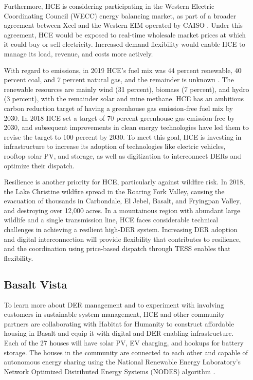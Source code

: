 Furthermore, HCE is considering participating in the Western Electric Coordinating Council (WECC) energy balancing market, as part of a broader agreement between Xcel and the Western EIM operated by CAISO \citep{CAISO2020}. Under this agreement, HCE would be exposed to real-time wholesale market prices at which it could buy or sell electricity. Increased demand flexibility would enable HCE to manage its load, revenue, and costs more actively.

With regard to emissions, in 2019 HCE's fuel mix was 44 percent renewable, 40 percent coal, and 7 percent natural gas, and the remainder is unknown \citep{HCE2019}. The renewable resources are mainly wind (31 percent), biomass (7 percent), and hydro (3 percent), with the remainder solar and mine methane. HCE has an ambitious carbon reduction target of having a greenhouse gas emission-free fuel mix by 2030. In 2018 HCE set a target of 70 percent greenhouse gas emission-free by 2030, and subsequent improvements in clean energy technologies have led them to revise the target to 100 percent by 2030. To meet this goal, HCE is investing in infrastructure to increase its adoption of technologies like electric vehicles, rooftop solar PV, and storage, as well as digitization to interconnect DERs and optimize their dispatch. 

Resilience is another priority for HCE, particularly against wildfire risk. In 2018, the Lake Christine wildfire spread in the Roaring Fork Valley, causing the evacuation of thousands in Carbondale, El Jebel, Basalt, and Fryingpan Valley, and destroying over 12,000 acres. In a mountainous region with abundant large wildlife and a single transmission line, HCE faces considerable technical challenges in achieving a resilient high-DER system. Increasing DER adoption and digital interconnection will provide flexibility that contributes to resilience, and the coordination using price-based dispatch through TESS enables that flexibility.

\subsection{Basalt Vista}\label{sec:Basalt}

To learn more about DER management and to experiment with involving customers in sustainable system management, HCE and other community partners are collaborating with Habitat for Humanity to construct affordable housing in Basalt and equip it with digital and DER-enabling infrastructure. Each of the 27 houses will have solar PV, EV charging, and hookups for battery storage. The houses in the community are connected to each other and capable of autonomous energy sharing using the National Renewable Energy Laboratory's Network Optimized Distributed Energy Systems (NODES) algorithm \citep{IEEESpectrumNREL}. 

